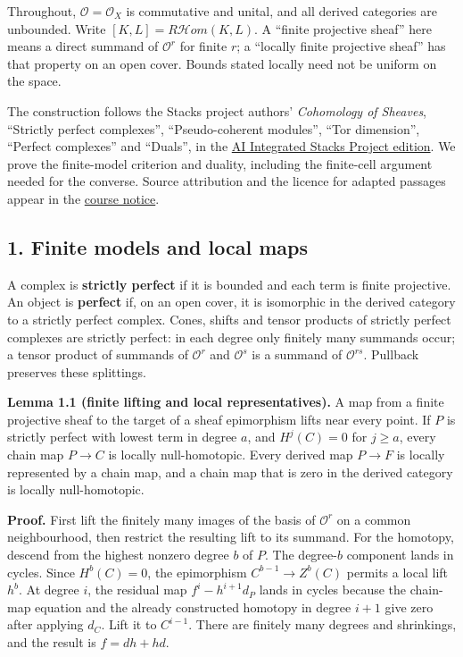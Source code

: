 \documentclass[
  english,
  11pt,
  a4paper,
]{article}
\begin{document}
Throughout, \(\mathcal O=\mathcal O_X\) is commutative and unital, and
all derived categories are unbounded. Write
\([K,L]=R\mathcal Hom(K,L)\). A ``finite projective sheaf'' here means a
direct summand of \(\mathcal O^r\) for finite \(r\); a ``locally finite
projective sheaf'' has that property on an open cover. Bounds stated
locally need not be uniform on the space.

The construction follows the Stacks project authors' \emph{Cohomology of
Sheaves}, ``Strictly perfect complexes'', ``Pseudo-coherent modules'',
``Tor dimension'', ``Perfect complexes'' and ``Duals'', in the
\href{https://github.com/KokunoYumeto/unofficial-stacks-project-ai-drafts/blob/565b10e987aba5969b21145a0833f42d69f96790/cohomology.tex}{AI
Integrated Stacks Project edition}. We prove the finite-model criterion
and duality, including the finite-cell argument needed for the converse.
Source attribution and the licence for adapted passages appear in the
\hyperref[sources-and-authorship]{course notice}.

\subsection{1. Finite models and local
maps}\label{perfect-complexes-and-duals--1-finite-models-and-local-maps}

A complex is \textbf{strictly perfect} if it is bounded and each term is
finite projective. An object is \textbf{perfect} if, on an open cover,
it is isomorphic in the derived category to a strictly perfect complex.
Cones, shifts and tensor products of strictly perfect complexes are
strictly perfect: in each degree only finitely many summands occur; a
tensor product of summands of \(\mathcal O^r\) and \(\mathcal O^s\) is a
summand of \(\mathcal O^{rs}\). Pullback preserves these splittings.

\textbf{Lemma 1.1 (finite lifting and local representatives).} A map
from a finite projective sheaf to the target of a sheaf epimorphism
lifts near every point. If \(P\) is strictly perfect with lowest term in
degree \(a\), and \(H^j(C)=0\) for \(j\ge a\), every chain map
\(P\to C\) is locally null-homotopic. Every derived map \(P\to F\) is
locally represented by a chain map, and a chain map that is zero in the
derived category is locally null-homotopic.

\textbf{Proof.} First lift the finitely many images of the basis of
\(\mathcal O^r\) on a common neighbourhood, then restrict the resulting
lift to its summand. For the homotopy, descend from the highest nonzero
degree \(b\) of \(P\). The degree-\(b\) component lands in cycles. Since
\(H^b(C)=0\), the epimorphism \(C^{b-1}\to Z^b(C)\) permits a local lift
\(h^b\). At degree \(i\), the residual map \(f^i-h^{i+1}d_P\) lands in
cycles because the chain-map equation and the already constructed
homotopy in degree \(i+1\) give zero after applying \(d_C\). Lift it to
\(C^{i-1}\). There are finitely many degrees and shrinkings, and the
result is \(f=dh+hd\).
\end{document}
